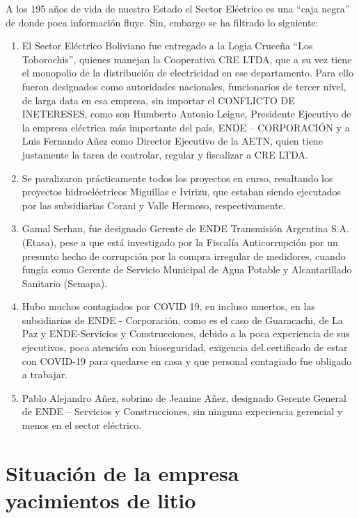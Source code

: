 \documentclass[a4paper, nobind]{templates/ociamthesis}
\begin{document}
A los 195 años de vida de nuestro Estado el Sector Eléctrico es una ``caja negra'' de donde poca información fluye. Sin, embargo se ha filtrado lo siguiente:

\begin{enumerate}
\def\labelenumi{\arabic{enumi}.}
\item
  El Sector Eléctrico Boliviano fue entregado a la Logia Cruceña ``Los Toborochis'', quienes manejan la Cooperativa CRE LTDA, que a su vez tiene el monopolio de la distribución de electricidad en ese departamento. Para ello fueron designados como autoridades nacionales, funcionarios de tercer nivel, de larga data en esa empresa, sin importar el CONFLICTO DE INETERESES, como son Humberto Antonio Leigue, Presidente Ejecutivo de la empresa eléctrica más importante del país, ENDE -- CORPORACIÓN y a Luis Fernando Añez como Director Ejecutivo de la AETN, quien tiene justamente la tarea de controlar, regular y fiscalizar a CRE LTDA.
\item
  Se paralizaron prácticamente todos los proyectos en curso, resaltando los proyectos hidroeléctricos Miguillas e Ivirizu, que estaban siendo ejecutados por las subsidiarias Corani y Valle Hermoso, respectivamente.
\item
  Gamal Serhan, fue designado Gerente de ENDE Transmisión Argentina S.A. (Etasa), pese a que está investigado por la Fiscalía Anticorrupción por un presunto hecho de corrupción por la compra irregular de medidores, cuando fungía como Gerente de Servicio Municipal de Agua Potable y Alcantarillado Sanitario (Semapa).
\item
  Hubo muchos contagiados por COVID 19, en incluso muertos, en las subsidiarias de ENDE - Corporación, como es el caso de Guaracachi, de La Paz y ENDE-Servicios y Construcciones, debido a la poca experiencia de sus ejecutivos, poca atención con bioseguridad, exigencia del certificado de estar con COVID-19 para quedarse en casa y que personal contagiado fue obligado a trabajar.
\item
  Pablo Alejandro Añez, sobrino de Jeanine Añez, designado Gerente General de ENDE -- Servicios y Construcciones, sin ninguna experiencia gerencial y menos en el sector eléctrico.
\end{enumerate}

\hypertarget{situaciuxf3n-de-la-empresa-yacimientos-de-litio}{%
\chapter{Situación de la empresa yacimientos de litio}\label{situaciuxf3n-de-la-empresa-yacimientos-de-litio}}
\end{document}
